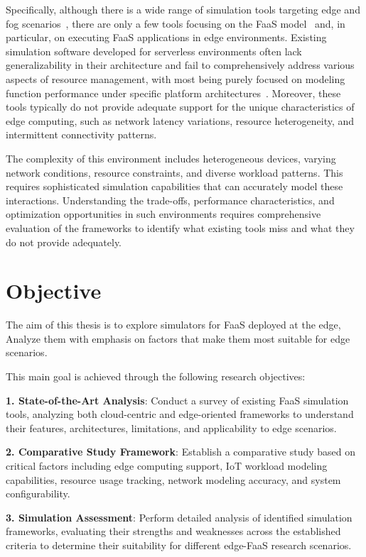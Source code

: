 Specifically, although there is a wide range of simulation tools targeting edge and fog scenarios~\cite{svorobej2019simulating}, there are only a few tools focusing on the FaaS model~\cite{mahmoudi2021simfaas} and, in particular, on executing FaaS applications in edge environments. Existing simulation software developed for serverless environments often lack generalizability in their architecture and fail to comprehensively address various aspects of resource management, with most being purely focused on modeling function performance under specific platform architectures~\cite{mampage2021cloudsimsc}. Moreover, these tools typically do not provide adequate support for the unique characteristics of edge computing, such as network latency variations, resource heterogeneity, and intermittent connectivity patterns.

The complexity of this environment includes heterogeneous devices, varying network conditions, resource constraints, and diverse workload patterns. This requires sophisticated simulation capabilities that can accurately model these interactions. Understanding the trade-offs, performance characteristics, and optimization opportunities in such environments requires comprehensive evaluation of the frameworks to identify what existing tools miss and what they do not provide adequately.

\section{Objective}

The aim of this thesis is to explore simulators for FaaS deployed at the edge, Analyze them  with emphasis on factors that make them most suitable for edge scenarios.

This main goal is achieved through the following research objectives:

\textbf{1. State-of-the-Art Analysis}: Conduct a survey of existing FaaS simulation tools, analyzing both cloud-centric and edge-oriented frameworks to understand their features, architectures, limitations, and applicability to edge scenarios.

\textbf{2. Comparative Study Framework}: Establish a comparative study based on critical factors including edge computing support, IoT workload modeling capabilities, resource usage tracking, network modeling accuracy, and system configurability.

\textbf{3. Simulation Assessment}: Perform detailed analysis of identified simulation frameworks, evaluating their strengths and weaknesses across the established criteria to determine their suitability for different edge-FaaS research scenarios.

